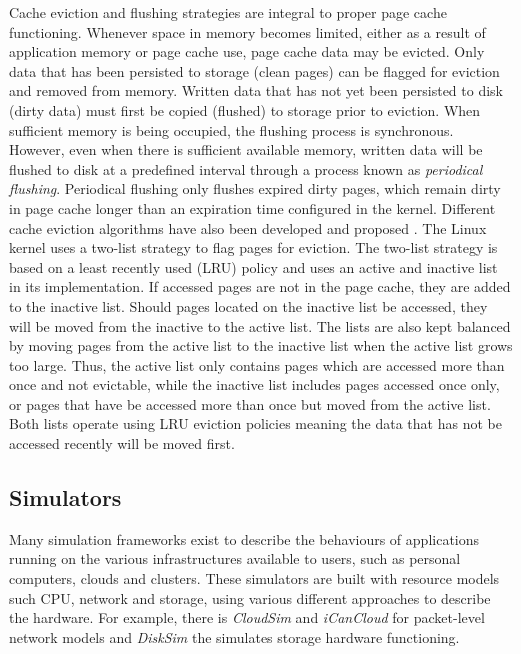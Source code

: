 \documentclass[conference]{IEEEtran}
\begin{document}
            Cache eviction and flushing strategies are integral to proper page cache functioning.
            Whenever space in memory becomes limited, either as a result of application memory
            or page cache use, page cache data may be evicted. Only data that 
            has been persisted to storage (clean pages) can be flagged for eviction and removed from
            memory. Written data that has not yet been persisted to disk (dirty data) must first
            be copied (flushed) to storage prior to eviction. When sufficient memory is
            being occupied, the flushing process is synchronous. However, even when 
            there is sufficient available memory, written data will be flushed to disk
            at a predefined interval through a process known as \textit{periodical flushing}.
            Periodical flushing only flushes expired dirty pages, which remain dirty in 
            page cache longer than an expiration time configured in the kernel. 
            Different cache eviction algorithms have also been developed and proposed
            \cite{owda2014comparison}.
            The Linux kernel uses a two-list strategy to flag pages for eviction.
            The two-list strategy is based on a least recently used (LRU) policy
            and uses an active and inactive list in its implementation.
            If accessed pages are not in the page cache, they are added to the inactive list. 
            Should pages located on the inactive list be accessed, they will be moved from 
            the inactive to the active list. 
            The lists are also kept balanced by moving pages from the active list
            to the inactive list when the active list grows too large.
            Thus, the active list only contains pages which are accessed more than once 
            and not evictable, while the inactive list includes pages accessed once only, 
            or pages that have be accessed more than once but moved from the active list. 
            Both lists operate using LRU eviction policies meaning the data that has
            not be accessed recently will be moved first.
             
        \subsection{Simulators}
            
            Many simulation frameworks exist to describe the behaviours of applications
            running on the various infrastructures available to users, such as personal computers,
            clouds and clusters.
            These simulators are built with resource models such CPU, network and 
            storage, using various different approaches to describe the hardware.
            For example, there is \textit{CloudSim} and \textit{iCanCloud} for packet-level network models 
            and \textit{DiskSim} the simulates storage hardware functioning.
\end{document}
